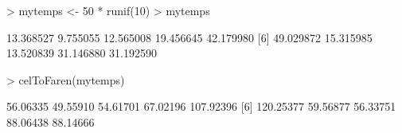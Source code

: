 \begin{Schunk}
\begin{Sinput}
> mytemps <- 50 * runif(10)
> mytemps
\end{Sinput}
\begin{Soutput}
 [1] 13.368527  9.755055 12.565008 19.456645 42.179980
 [6] 49.029872 15.315985 13.520839 31.146880 31.192590
\end{Soutput}
\begin{Sinput}
> celToFaren(mytemps)
\end{Sinput}
\begin{Soutput}
 [1]  56.06335  49.55910  54.61701  67.02196 107.92396
 [6] 120.25377  59.56877  56.33751  88.06438  88.14666
\end{Soutput}
\end{Schunk}
